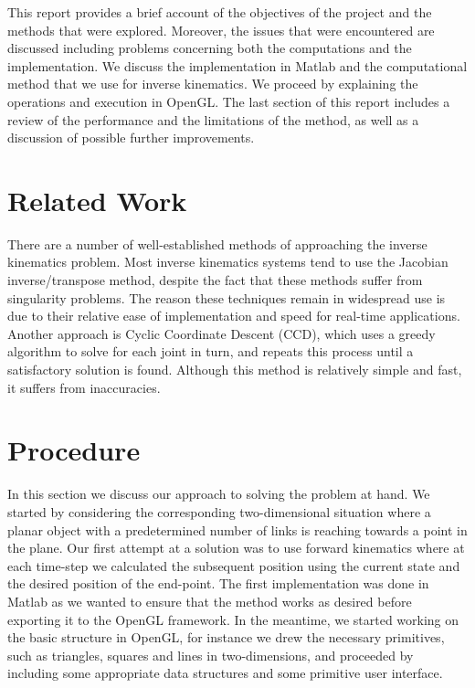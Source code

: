\documentclass[paper=a4, fontsize=11pt]{scrartcl} %
\numberwithin{equation}{section} %
\numberwithin{figure}{section} %
\numberwithin{table}{section} %
\begin{document}
This report provides a brief account of the objectives of the project and the methods that were explored. Moreover, the issues that were encountered are discussed including problems concerning both the computations and the implementation. We discuss the implementation in Matlab and the computational method that we use for inverse kinematics. We proceed by explaining the operations and execution in OpenGL. The last section of this report includes a review of the performance and the limitations of the method, as well as a discussion of possible further improvements.



\section{Related Work}
There are a number of well-established methods of approaching the inverse kinematics problem. Most inverse kinematics systems tend to use the Jacobian inverse/transpose method, despite the fact that these methods suffer from singularity problems. The reason these techniques remain in widespread use is due to their relative ease of implementation and speed for real-time applications. \\

Another approach is Cyclic Coordinate Descent (CCD), which uses a greedy algorithm to solve for each joint in turn, and repeats this process until a satisfactory solution is found. Although this method is relatively simple and fast, it suffers from inaccuracies.


\section{Procedure}
In this section we discuss our approach to solving the problem at hand. We started by considering the corresponding two-dimensional situation where a planar object with a predetermined number of links is reaching towards a point in the plane. Our first attempt at a solution was to use forward kinematics where at each time-step we calculated the subsequent position using the current state and the desired position of the end-point. The first implementation was done in Matlab as we wanted to ensure that the method works as desired before exporting it to the OpenGL framework. In the meantime, we started working on the basic structure in OpenGL, for instance we drew the necessary primitives, such as triangles, squares and lines in two-dimensions, and proceeded by including some appropriate data structures and some primitive user interface. \\
\end{document}
